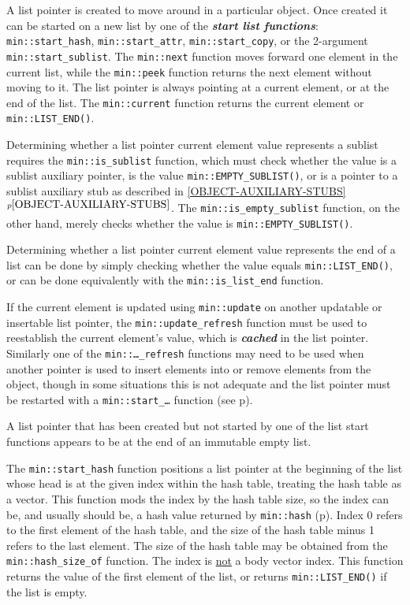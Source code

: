 \documentclass[12pt]{article}
\newcommand{\skey}[2]{{\bf \em #1#2}\index{#1}}
\newcommand{\ikey}[2]{{\bf \em #1}\index{#2}}
\newcommand{\itemref}[1]{\ref{#1}$^{p\pageref{#1}}$}
\newcommand{\pagref}[1]{p\pageref{#1}}
\newcommand{\EOL}{\penalty \exhyphenpenalty}
\begin{document}
A list pointer is created to move around in a particular object.
Once created it can be started on a new list by one of the
\skey{start list function}s:
{\tt min::\EOL start\_\EOL hash}, {\tt min::\EOL start\_\EOL attr},
{\tt min::\EOL start\_\EOL copy}, or
the 2-argument {\tt min::\EOL start\_\EOL sublist}.
The {\tt min::\EOL next} function moves forward one element
in the current list,
while the {\tt min::\EOL peek} function returns the next element without
moving to it.
The list pointer is always pointing at a current element, or at
the end of the list.
The {\tt min::\EOL current} function returns the current element
or {\tt min::\EOL LIST\_\EOL END()}.

Determining whether a list pointer current element value
represents a sublist requires
the {\tt min::\EOL is\_\EOL sublist} function, which must check whether the
value is a sublist auxiliary pointer,
is the value {\tt min::\EOL EMPTY\_\EOL SUBLIST()},
or is a pointer to a sublist auxiliary stub as described in
\itemref{OBJECT-AUXILIARY-STUBS}.
The {\tt min::\EOL is\_\EOL empty\_\EOL sublist}
function, on the other hand, merely checks whether the value is
{\tt min::\EOL EMPTY\_\EOL SUBLIST()}.

Determining whether a list pointer current element value
represents the end of a list can be done by
simply checking whether the value equals {\tt min::\EOL LIST\_\EOL END()},
or can be done equivalently
with the {\tt min::\EOL is\_\EOL list\_\EOL end} function.

If the current element
is updated using {\tt min::\EOL update}
on another updatable or insertable list pointer,
the {\tt min::\EOL update\_\EOL refresh} function
must be used to reestablish the
current element's value,
which is \ikey{cached}{cache!list pointer}\label{LIST-POINTER-CACHE}
in the list pointer.
Similarly one of the {\tt min::\EOL\ldots\_refresh} functions may
need to be used when another pointer is used to insert elements into
or remove elements
from the object, though in some situations this is
not adequate and the list pointer must be restarted
with a {\tt min::\EOL start\_\dots} function
(see \pagref{RESTARTING_LIST_PTR}).

A list pointer that has been created but not started by one of the
list start functions appears to be
at the end of an immutable empty list.

The {\tt min::\EOL start\_\EOL hash} function positions
a list pointer at the beginning of the
list whose head is at the given index within the hash table, treating the
hash table as a vector.  This function mods the index by the hash table
size, so the index can be, and usually should be, a hash value returned
by {\tt min::\EOL hash} (\pagref{MIN::HASH}).
Index 0 refers to the first element of the hash table,
and the size of the hash table minus 1 refers to the last element.
The size of the hash table may be obtained from the
{\tt min::\EOL hash\_\EOL size\_\EOL of} function.
The index is \underline{not} a body vector index.
This function returns the value of the first
element of the list, or returns {\tt min::\EOL LIST\_\EOL END()}
if the list is empty.
\end{document}
